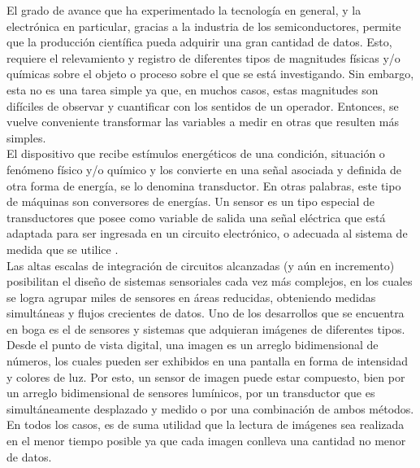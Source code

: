 El grado de avance que ha experimentado la tecnología en general, y la electrónica en particular, gracias a la industria de los semiconductores, permite que la producción científica pueda adquirir una gran cantidad de datos. Esto, requiere el relevamiento y registro de diferentes tipos de magnitudes físicas y/o químicas sobre el objeto o proceso sobre el que se está investigando. Sin embargo, esta no es una tarea simple ya que, en muchos casos, estas magnitudes son difíciles de observar y cuantificar con los sentidos de un operador. Entonces, se vuelve conveniente transformar las variables a medir en otras que resulten más simples.\\

El dispositivo que recibe estímulos energéticos de una condición, situación o fenómeno físico y/o químico y los convierte en una señal asociada y definida de otra forma de energía, se lo denomina transductor\cite{Pallas-Areny2001}\cite{considine1971encyclopedia}. En otras palabras, este tipo de máquinas son conversores de energías\cite{considine1971encyclopedia}\cite{Pallas-Areny2001}\cite{PerezGarcia2008}. Un sensor es un tipo especial de transductores que posee como variable de salida una señal eléctrica que está adaptada para ser ingresada en un circuito electrónico, o adecuada al sistema de medida que se utilice \cite{Fraden2010}\cite{Slawinski2011}\cite{Ogata2002}.\\

Las altas escalas de integración de circuitos alcanzadas (y aún en incremento) posibilitan el diseño de sistemas  sensoriales cada vez más complejos, en los cuales se logra agrupar miles de sensores en áreas reducidas, obteniendo medidas simultáneas y flujos crecientes de datos. Uno de los desarrollos que se encuentra en boga es el de sensores y sistemas que adquieran imágenes de diferentes tipos. Desde el punto de vista digital, una imagen es un arreglo bidimensional de números, los cuales pueden ser exhibidos en una pantalla en forma de intensidad y colores de luz. Por esto, un sensor de imagen puede estar compuesto, bien por un arreglo bidimensional de sensores lumínicos, por un transductor que es simultáneamente desplazado y medido o por una combinación de ambos métodos. En todos los casos, es de suma utilidad que la lectura de imágenes sea realizada en el menor tiempo posible ya que cada imagen conlleva una cantidad no menor de datos.\\

